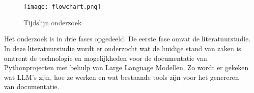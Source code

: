 
\chapter{}%
\label{ch:methodologie}

\begin{figure}[h]
    \centering
    \texttt{[image: flowchart.png]}
    \caption{Tijdslijn onderzoek}
    \label{fig:flowchart}
\end{figure}

Het onderzoek is in drie fases opgedeeld. De eerste fase omvat de literatuurstudie.
In deze literatuurstudie wordt er onderzocht wat de huidige stand van zaken is omtrent de technologie en mogelijkheden voor de documentatie van Pythonprojecten met behulp van Large Language Modellen.
Zo wordt er gekeken wat LLM's zijn, hoe ze werken en wat bestaande tools zijn voor het genereren van documentatie.

